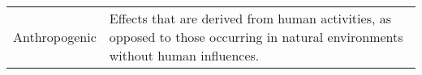 
\label{sec:Definitions}


\begin{tabular}{p{40mm}p{130mm}}
Anthropogenic &Effects that are derived from human activities, as opposed to those occurring in natural environments without human influences.\\

\end{tabular} 
